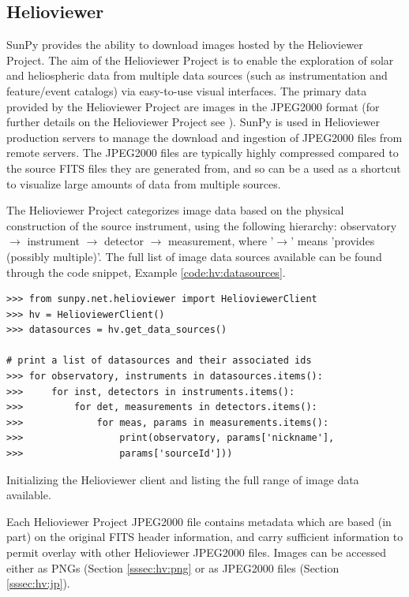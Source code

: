 \subsection{Helioviewer}\label{ssec:hv}

SunPy provides the ability to download images hosted by the Helioviewer Project.  
The aim of the Helioviewer Project is to enable the exploration of 
solar and heliospheric data from multiple data sources (such as instrumentation 
and feature/event catalogs) via easy-to-use visual interfaces.  The primary 
data provided by the Helioviewer Project are images in the JPEG2000 format (for 
further details on the Helioviewer Project see \cite{muller2009}). 
SunPy is used in Helioviewer production servers to manage the 
download and ingestion of JPEG2000 files from remote servers.  The JPEG2000 
files are typically highly compressed compared to the source FITS files they 
are generated from, and so can be a used as a shortcut to visualize large 
amounts of data from multiple sources.

The Helioviewer Project categorizes image data based on the physical
construction of the source instrument, using the following hierarchy:
observatory $\rightarrow$ instrument $\rightarrow$ detector
$\rightarrow$ measurement, where '$\rightarrow$' means 'provides
(possibly multiple)'.  The full list of image data sources available
can be found through the code snippet, Example
\ref{code:hv:datasources}.
\begin{listing}[H]
\begin{verbatim}
>>> from sunpy.net.helioviewer import HelioviewerClient
>>> hv = HelioviewerClient()
>>> datasources = hv.get_data_sources()

# print a list of datasources and their associated ids
>>> for observatory, instruments in datasources.items():
>>>     for inst, detectors in instruments.items():
>>>         for det, measurements in detectors.items():
>>>             for meas, params in measurements.items():
>>>                 print(observatory, params['nickname'], 
>>>                 params['sourceId']))
\end{verbatim}
\caption{Initializing the Helioviewer client and listing the full
  range of image data available.}
\label{code:hv:datasources}
\end{listing}

Each Helioviewer Project JPEG2000 file contains metadata which are
based (in part) on the original FITS header information, and carry
sufficient information to permit overlay with other Helioviewer
JPEG2000 files. Images can be accessed either as PNGs (Section
\ref{sssec:hv:png} or as JPEG2000 files (Section \ref{sssec:hv:jp}).

